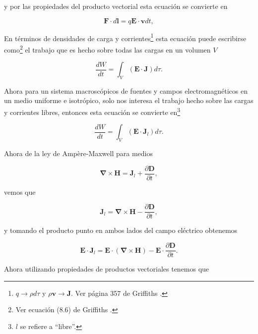 \documentclass[a4paper,11pt]{article}
\numberwithin{equation}{section}
\begin{document}
y por las propiedades del producto vectorial esta ecuación se convierte en 

\begin{equation}
 \mathbf{F}\cdot d\mathbf{l} = q\mathbf{E}\cdot \mathbf{v}dt,
\end{equation}

En términos de densidades de carga y corrientes\footnote{$q \rightarrow \rho d\tau$ 
y $\rho\mathbf{v} \rightarrow \mathbf{J}$. Ver página 357 de Griffiths \cite{griffiths}.} 
esta ecuación puede escribirse como\footnote{Ver ecuación (8.6) de Griffiths \cite{griffiths}.}
el trabajo que es hecho sobre todas las cargas en un volumen $V$ 

\begin{equation}
 \frac{dW}{dt} = \int_V (\mathbf{E} \cdot \mathbf{J}) d\tau.
\end{equation}

Ahora para un sistema macroscópicos de fuentes y campos electromagnéticos en 
un medio uniforme e isotrópico, solo nos interesa el trabajo hecho sobre las cargas y 
corrientes libres, entonces esta ecuación se convierte en\footnote{$l$ se refiere 
a ``libre''.}

\begin{equation}
 \frac{dW}{dt} = \int_V (\mathbf{E} \cdot \mathbf{J}_l) d\tau.
 \label{eq:trabajoMateriales}
\end{equation}

Ahora de la ley de Ampère-Maxwell para medios 

\begin{equation}
 \pmb{\nabla} \times \mathbf{H} = \mathbf{J}_l + \frac{\partial \mathbf{D}}{\partial t},
\label{eq:amperemaxwell}
\end{equation}

vemos que 

\begin{equation}
 \mathbf{J}_l = \pmb{\nabla} \times \mathbf{H} - \frac{\partial \mathbf{D}}{\partial t},
\end{equation}

y tomando el producto punto en ambos lados del campo eléctrico obtenemos 

\begin{equation}
 \mathbf{E} \cdot \mathbf{J}_l  = \mathbf{E} \cdot (\pmb{\nabla} \times \mathbf{H}) - 
  \mathbf{E} \cdot \frac{\partial \mathbf{D}}{\partial t}.
\end{equation}

Ahora utilizando propiedades de productos vectoriales tenemos que 
\end{document}
